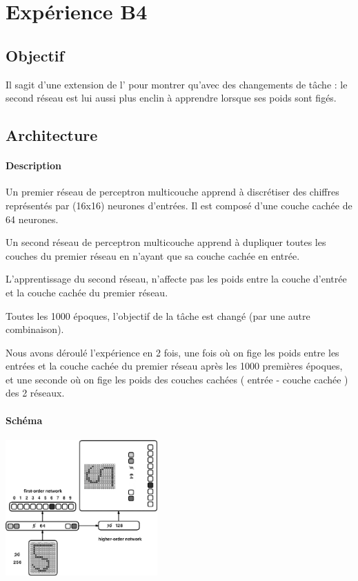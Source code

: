\section{Expérience B4} \label{expB4}
  \subsection{Objectif}
  Il sagit d'une extension de l' pour montrer qu'avec des changements de tâche :
  le second réseau est lui aussi plus enclin à apprendre lorsque ses poids sont figés.
   
  \subsection{Architecture}
    \paragraph{Description}
      Un premier réseau de perceptron multicouche apprend à discrétiser des chiffres représentés
      par (16x16) neurones d'entrées. Il est composé d'une couche cachée de 64 neurones.
      
      Un second réseau de perceptron multicouche apprend à dupliquer toutes les couches du premier
      réseau en n'ayant que sa couche cachée en entrée.
      
      L'apprentissage du second réseau, n'affecte pas les poids entre la couche d'entrée et la 
      couche cachée du premier réseau.
      
      Toutes les 1000 époques, l'objectif de la tâche est changé (par une autre combinaison).
      
      Nous avons déroulé l'expérience en 2 fois, une fois où on fige les poids
      entre les entrées et la couche cachée du premier réseau après les 1000 premières époques, 
      et une seconde où on fige les poids des couches cachées ( entrée - couche cachée ) des 2 réseaux.
    \paragraph{Schéma}
      \begin{center}
	\includegraphics[width=220px]{data/expA3/schema.png}
      \end{center}
      
